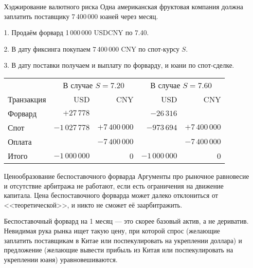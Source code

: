 \documentclass{beamer}
\begin{document}
\begin{frame}{Хэджирование валютного риска}
\justify
Одна американская фруктовая компания должна заплатить поставщику 7\,400\,000 юаней через месяц.

1. Продаём форвард 1\,000\,000 USDCNY по 7.40.

2. В дату фиксинга покупаем 7\,400\,000 CNY по спот-курсу $S$.

3. В дату поставки получаем и выплату по форварду, и юани по спот-сделке.

\justify
\centering
\small
\begin{tabular}{l|r|r|r|r}
& \multicolumn{2}{c|}{В случае $S=7.20$} & \multicolumn{2}{c}{В случае $S=7.60$} \\ \cline{2-5}
Транзакция & USD & CNY & USD & CNY \\ \hline
Форвард & $+27\,778$ &  &  $-26\,316$& \\
Спот & $-1\,027\,778$ & $+7\,400\,000$ & $-973\,694$ & $+7\,400\,000$ \\
Оплата & & $-7\,400\,000$ & & $-7\,400\,000$ \\ \hline
Итого & $-1\,000\,000$ & 0 & $-1\,000\,000$ & 0
\end{tabular}\end{frame}



\begin{frame}{Ценообразование беспоставочного форварда}
\justify
Аргументы про рыночное равновесие и отсутствие арбитража не работают, если есть ограничения на движение капитала. Цена беспоставочного форварда может далеко отклониться от <<теоретической>>, и никто не сможет её заарбитражить.

\justify
Беспоставочный форвард на 1 месяц --- это скорее базовый актив, а не дериватив. Невидимая рука рынка ищет такую цену, при которой спрос (желающие заплатить поставщикам в Китае или поспекулировать на укреплении доллара) и предложение (желающие вывести прибыль из Китая или поспекулировать на укреплении юаня) уравновешиваются.
\end{frame}
\end{document}
